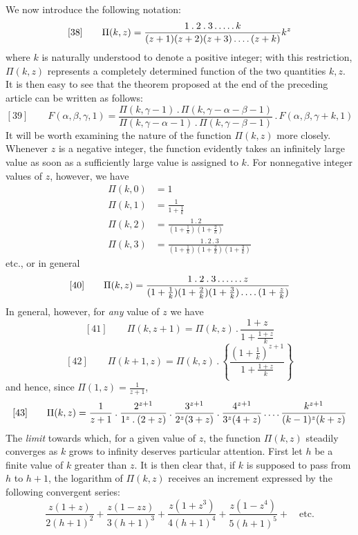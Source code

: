 We now introduce the following notation:
\[
[38]\qquad \Pi(k,z)=\frac{1\mathbin{.}2\mathbin{.}3\mathinner{.\,.\,.\,.\,.}k}{(z+1)(z+2)(z+3)\mathinner{.\,.\,.\,.}(z+k)}k^z
\]
where $k$ is naturally understood to denote a positive integer; with this restriction, $\Pi(k,z)$ represents a completely determined function of the two quantities $k,z$. It is then easy to see that the theorem proposed at the end of the preceding article can be written as follows:
\[
[39]\qquad F(\alpha,\beta,\gamma,1)=\frac{\Pi(k,\gamma-1)\mathbin{.}\Pi(k,\gamma-\alpha-\beta-1)}{\Pi(k,\gamma-\alpha-1)\mathbin{.}\Pi(k,\gamma-\beta-1)}\mathbin{.}F(\alpha,\beta,\gamma+k,1)
\]
It will be worth examining the nature of the function $\Pi(k,z)$ more closely. Whenever $z$ is a negative integer, the function evidently takes an infinitely large value as soon as a sufficiently large value is assigned to $k$. For nonnegative integer values of $z$, however, we have
\[
\begin{aligned}
\Pi(k,0)&=1\\[5pt]
\Pi(k,1)&=\frac{1}{1+\frac1k}\\[5pt]
\Pi(k,2)&=\frac{1\mathbin{.}2}{(1+\frac1k)(1+\frac2k)}\\[5pt]
\Pi(k,3)&=\frac{1\mathbin{.}2\mathbin{.}3}{(1+\frac1k)(1+\frac2k)(1+\frac3k)}
\end{aligned}
\]
etc., or in general
\[
[40]\qquad \Pi(k,z)=\frac{1\mathbin{.}2\mathbin{.}3\mathinner{.\,.\,.\,.\,.\,.}z}{(1+\frac1k)(1+\frac2k)(1+\frac3k)\mathinner{.\,.\,.\,.}(1+\frac zk)}
\]
In general, however, for \textit{any} value of $z$ we have
\[
[41]\qquad \Pi(k,z+1)=\Pi(k,z)\mathbin{.}\frac{1+z}{1+\frac{1+z}{k}}
\]
\[
[42]\qquad \Pi(k+1,z)=\Pi(k,z)\mathbin{.}\left\{\frac{(1+\frac1k)^{z+1}}{1+\frac{1+z}{k}}\right\}
\]
and hence, since $\Pi(1,z)=\frac1{z+1}$,
\[
[43]\qquad \Pi(k,z)=\frac1{z+1}\mathbin{.}\frac{2^{z+1}}{1^z\mathbin{.}(2+z)}\mathbin{.}\frac{3^{z+1}}{2^z(3+z)}\mathbin{.}\frac{4^{z+1}}{3^z(4+z)}\mathinner{.\,.\,.\,.}\frac{k^{z+1}}{(k-1)^z(k+z)}
\]
The \textit{limit} towards which, for a given value of $z$, the function $\Pi(k,z)$ steadily converges as $k$ grows to infinity deserves particular attention. First let $h$ be a finite value of $k$ greater than $z$. It is then clear that, if $k$ is supposed to pass from $h$ to $h+1$, the logarithm of $\Pi(k,z)$ receives an increment expressed by the following convergent series:
\[
\frac{z(1+z)}{2(h+1)^2}+\frac{z(1-zz)}{3(h+1)^3}+\frac{z(1+z^3)}{4(h+1)^4}+\frac{z(1-z^4)}{5(h+1)^5}+\quad\text{etc.}
\]
